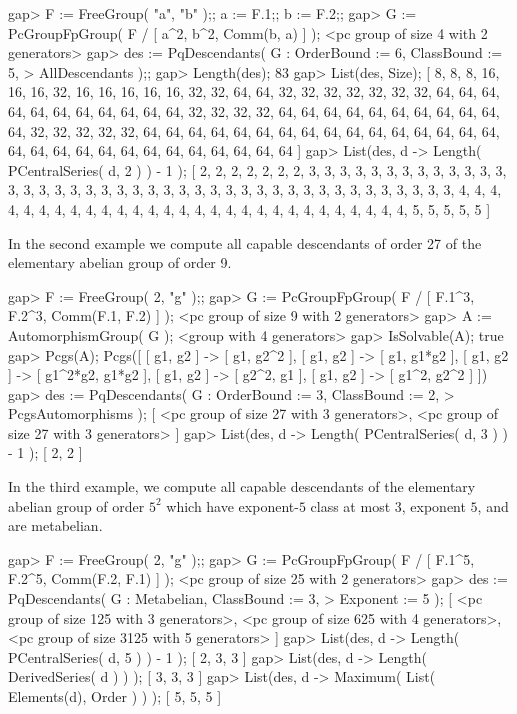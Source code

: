 \beginexample
gap> F := FreeGroup( "a", "b" );; a := F.1;; b := F.2;;         
gap> G := PcGroupFpGroup( F / [ a^2, b^2, Comm(b, a) ] );
<pc group of size 4 with 2 generators>
gap> des := PqDescendants( G : OrderBound := 6, ClassBound := 5,
>                              AllDescendants );;
gap> Length(des);
83
gap> List(des, Size); 
[ 8, 8, 8, 16, 16, 16, 32, 16, 16, 16, 16, 16, 32, 32, 64, 64, 32, 32, 32, 
  32, 32, 32, 32, 64, 64, 64, 64, 64, 64, 64, 64, 64, 64, 64, 32, 32, 32, 32, 
  64, 64, 64, 64, 64, 64, 64, 64, 64, 64, 64, 32, 32, 32, 32, 32, 64, 64, 64, 
  64, 64, 64, 64, 64, 64, 64, 64, 64, 64, 64, 64, 64, 64, 64, 64, 64, 64, 64, 
  64, 64, 64, 64, 64, 64, 64 ]
gap> List(des, d -> Length( PCentralSeries( d, 2 ) ) - 1 );
[ 2, 2, 2, 2, 2, 2, 2, 3, 3, 3, 3, 3, 3, 3, 3, 3, 3, 3, 3, 3, 3, 3, 3, 3, 3, 
  3, 3, 3, 3, 3, 3, 3, 3, 3, 3, 3, 3, 3, 3, 3, 3, 3, 3, 3, 3, 3, 3, 3, 3, 4, 
  4, 4, 4, 4, 4, 4, 4, 4, 4, 4, 4, 4, 4, 4, 4, 4, 4, 4, 4, 4, 4, 4, 4, 4, 4, 
  4, 4, 4, 5, 5, 5, 5, 5 ]
\endexample

In the second example we compute all  capable descendants of order  27 of
the  elementary abelian group of order 9.  

\beginexample
gap> F := FreeGroup( 2, "g" );;                                  
gap> G := PcGroupFpGroup( F / [ F.1^3, F.2^3, Comm(F.1, F.2) ] );
<pc group of size 9 with 2 generators>
gap> A := AutomorphismGroup( G );
<group with 4 generators>
gap> IsSolvable(A);
true
gap> Pcgs(A);
Pcgs([ [ g1, g2 ] -> [ g1, g2^2 ], [ g1, g2 ] -> [ g1, g1*g2 ], 
  [ g1, g2 ] -> [ g1^2*g2, g1*g2 ], [ g1, g2 ] -> [ g2^2, g1 ], 
  [ g1, g2 ] -> [ g1^2, g2^2 ] ])
gap> des := PqDescendants( G : OrderBound := 3, ClassBound := 2,
>                              PcgsAutomorphisms );
[ <pc group of size 27 with 3 generators>, 
  <pc group of size 27 with 3 generators> ]
gap> List(des, d -> Length( PCentralSeries( d, 3 ) ) - 1 );
[ 2, 2 ]
\endexample

In  the  third  example,  we  compute  all  capable  descendants  of  the
elementary abelian group of order  $5^2$ which have exponent-$5$ class at
most $3$, exponent $5$, and are metabelian.

\beginexample
gap> F := FreeGroup( 2, "g" );;                                  
gap> G := PcGroupFpGroup( F / [ F.1^5, F.2^5, Comm(F.2, F.1) ] );
<pc group of size 25 with 2 generators>
gap> des := PqDescendants( G : Metabelian, ClassBound := 3,
>                              Exponent := 5 );
[ <pc group of size 125 with 3 generators>, 
  <pc group of size 625 with 4 generators>, 
  <pc group of size 3125 with 5 generators> ]
gap> List(des, d -> Length( PCentralSeries( d, 5 ) ) - 1 );
[ 2, 3, 3 ]
gap> List(des, d -> Length( DerivedSeries( d ) ) );
[ 3, 3, 3 ]
gap> List(des, d -> Maximum( List( Elements(d), Order ) ) );     
[ 5, 5, 5 ]
\endexample

